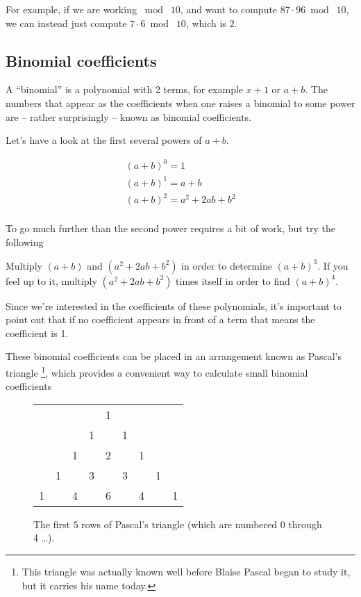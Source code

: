 For example, if we are working $\bmod\; 10$, and want to compute 
$87 \cdot 96 \bmod\; 10$, we can instead just compute $7 \cdot 6 \bmod\; 10$,
which is $2$.

\subsection{Binomial coefficients}
\label{binom_coeff}

A ``binomial'' is a polynomial with 2 terms, for example $x+1$ or $a+b$.
The numbers that appear as the coefficients when one raises a binomial
to some power are -- rather surprisingly -- known as 
 binomial coefficients.

Let's have a look at the first several powers of $a+b$.

\begin{gather*}
(a+b)^0 = 1 \\
(a+b)^1 = a+b \\
(a+b)^2 = a^2 + 2ab + b^2 \\
\end{gather*} 

To go much further than the second power requires a bit of work,
but try the following

\begin{exer}
Multiply $(a+b)$ and $(a^2 + 2ab + b^2)$ in order to determine $(a+b)^3$.
If you feel up to it, multiply $(a^2 + 2ab + b^2)$ times itself in order
to find $(a+b)^4$.
\end{exer}

Since we're interested in the coefficients of these polynomials, it's important
to point out that if no coefficient appears in front of a term that means the
coefficient is 1.

These binomial coefficients can be placed in an arrangement known as
  Pascal's triangle
\footnote{This triangle was actually known well before Blaise Pascal %
began to study it, but it carries his name today.}, which
provides a convenient way to calculate small binomial coefficients

\begin{figure}[!hbt]
\begin{center}
\begin{tabular}{ccccccccc}
 & & & & 1 & & & & \\
 & & & 1 & & 1 & & & \\
 & & 1 &  & 2 &  & 1 & & \\ 
 & 1 & & 3 & & 3 & & 1 & \\
1 & & 4 & & 6 & & 4 & & 1 \\
\end{tabular}
\end{center}

\vspace{.2in}

\caption[Pascal's triangle.]{The first $5$ rows of Pascal's triangle (which are numbered 0 through 4 \ldots).}
\label{fig:pascal}
\end{figure}

